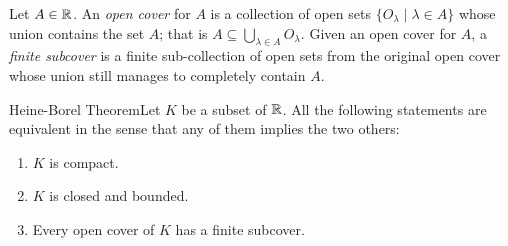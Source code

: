 \begin{definition}
    Let \(A \in \mathbb{R}\). An \textit{open cover} for \(A\) is a collection of open sets \(\{O_\lambda \mid \lambda \in A\}\) whose union contains the set \(A\); that is \(A \subseteq \bigcup_{\lambda \in A}O_\lambda\). Given an open cover for \(A\), a \textit{finite subcover} is a finite sub-collection of open sets from the original open cover whose union still manages to completely contain \(A\).
\end{definition}

\begin{ntheorem}
    {Heine-Borel Theorem}Let \(K\) be a  subset of  \(\mathbb{R}\). All the following statements are equivalent in the sense that any of them implies the two others: 
    \begin{enumerate}[label=(\roman*)]
        \item \(K\) is compact.
        \item \(K\) is closed and bounded.
        \item Every open cover of \(K\) has a finite subcover.
    \end{enumerate}
\end{ntheorem}

